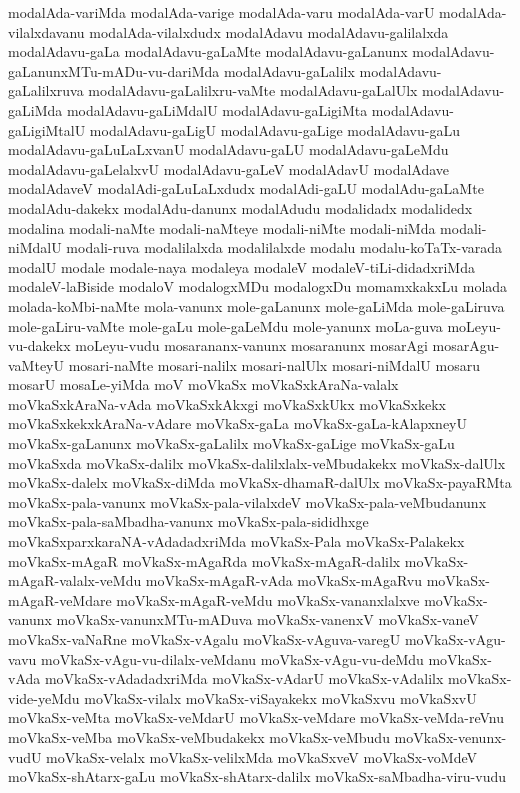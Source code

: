 {modalAda-variMda
modalAda-varige
modalAda-varu
modalAda-varU
modalAda-vilalxdavanu
modalAda-vilalxdudx
modalAdavu
modalAdavu-galilalxda
modalAdavu-gaLa
modalAdavu-gaLaMte
modalAdavu-gaLanunx
modalAdavu-gaLanunxMTu-mADu-vu-dariMda
modalAdavu-gaLalilx
modalAdavu-gaLalilxruva
modalAdavu-gaLalilxru-vaMte
modalAdavu-gaLalUlx
modalAdavu-gaLiMda
modalAdavu-gaLiMdalU
modalAdavu-gaLigiMta
modalAdavu-gaLigiMtalU
modalAdavu-gaLigU
modalAdavu-gaLige
modalAdavu-gaLu
modalAdavu-gaLuLaLxvanU
modalAdavu-gaLU
modalAdavu-gaLeMdu
modalAdavu-gaLelalxvU
modalAdavu-gaLeV
modalAdavU
modalAdave
modalAdaveV
modalAdi-gaLuLaLxdudx
modalAdi-gaLU
modalAdu-gaLaMte
modalAdu-dakekx
modalAdu-danunx
modalAdudu
modalidadx
modalidedx
modalina
modali-naMte
modali-naMteye
modali-niMte
modali-niMda
modali-niMdalU
modali-ruva
modalilalxda
modalilalxde
modalu
modalu-koTaTx-varada
modalU
modale
modale-naya
modaleya
modaleV
modaleV-tiLi-didadxriMda
modaleV-laBiside
modaloV
modalogxMDu
modalogxDu
momamxkakxLu
molada
molada-koMbi-naMte
mola-vanunx
mole-gaLanunx
mole-gaLiMda
mole-gaLiruva
mole-gaLiru-vaMte
mole-gaLu
mole-gaLeMdu
mole-yanunx
moLa-guva
moLeyu-vu-dakekx
moLeyu-vudu
mosarananx-vanunx
mosaranunx
mosarAgi
mosarAgu-vaMteyU
mosari-naMte
mosari-nalilx
mosari-nalUlx
mosari-niMdalU
mosaru
mosarU
mosaLe-yiMda
moV
moVkaSx
moVkaSxkAraNa-valalx
moVkaSxkAraNa-vAda
moVkaSxkAkxgi
moVkaSxkUkx
moVkaSxkekx
moVkaSxkekxkAraNa-vAdare
moVkaSx-gaLa
moVkaSx-gaLa-kAlapxneyU
moVkaSx-gaLanunx
moVkaSx-gaLalilx
moVkaSx-gaLige
moVkaSx-gaLu
moVkaSxda
moVkaSx-dalilx
moVkaSx-dalilxlalx-veMbudakekx
moVkaSx-dalUlx
moVkaSx-dalelx
moVkaSx-diMda
moVkaSx-dhamaR-dalUlx
moVkaSx-payaRMta
moVkaSx-pala-vanunx
moVkaSx-pala-vilalxdeV
moVkaSx-pala-veMbudanunx
moVkaSx-pala-saMbadha-vanunx
moVkaSx-pala-sididhxge
moVkaSxparxkaraNA-vAdadadxriMda
moVkaSx-Pala
moVkaSx-Palakekx
moVkaSx-mAgaR
moVkaSx-mAgaRda
moVkaSx-mAgaR-dalilx
moVkaSx-mAgaR-valalx-veMdu
moVkaSx-mAgaR-vAda
moVkaSx-mAgaRvu
moVkaSx-mAgaR-veMdare
moVkaSx-mAgaR-veMdu
moVkaSx-vananxlalxve
moVkaSx-vanunx
moVkaSx-vanunxMTu-mADuva
moVkaSx-vanenxV
moVkaSx-vaneV
moVkaSx-vaNaRne
moVkaSx-vAgalu
moVkaSx-vAguva-varegU
moVkaSx-vAgu-vavu
moVkaSx-vAgu-vu-dilalx-veMdanu
moVkaSx-vAgu-vu-deMdu
moVkaSx-vAda
moVkaSx-vAdadadxriMda
moVkaSx-vAdarU
moVkaSx-vAdalilx
moVkaSx-vide-yeMdu
moVkaSx-vilalx
moVkaSx-viSayakekx
moVkaSxvu
moVkaSxvU
moVkaSx-veMta
moVkaSx-veMdarU
moVkaSx-veMdare
moVkaSx-veMda-reVnu
moVkaSx-veMba
moVkaSx-veMbudakekx
moVkaSx-veMbudu
moVkaSx-venunx-vudU
moVkaSx-velalx
moVkaSx-velilxMda
moVkaSxveV
moVkaSx-voMdeV
moVkaSx-shAtarx-gaLu
moVkaSx-shAtarx-dalilx
moVkaSx-saMbadha-viru-vudu
}
